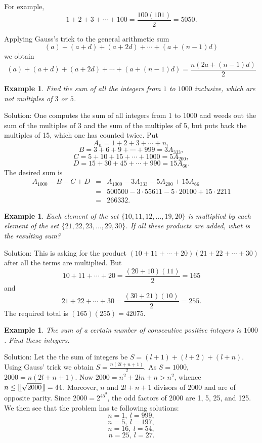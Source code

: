\documentclass[11pt, openany]{book}
\theoremstyle{change} \theoremheaderfont{\blue\sffamily\bfseries}
\newtheorem{exa}[thm]{Example}
\theoremstyle{nonumberplain} \theoremheaderfont{\sffamily\bfseries}
\newcommand{\dis}{\displaystyle}
\newcommand{\í}{\'{\i}}
\begin{document}
For example,
$$1 + 2 + 3 + \cdots + 100 = \frac{100(101)}{2} = 5050.$$


Applying Gauss's trick to the general arithmetic sum
$$ (a) + (a + d) + (a + 2d) + \cdots + (a + (n - 1)d) $$we obtain
\begin{equation}
(a) + (a + d) + (a + 2d) + \cdots + (a + (n - 1)d) = \frac{n(2a +
(n - 1)d)}{2}
\end{equation}


\begin{exa} Find the sum of all the integers from $1$ to $1000$ inclusive, which are not
multiples of $3$ or $5$.
\end{exa}
Solution: One computes the sum of all integers from 1 to 1000 and
weeds out the sum of the multiples of 3 and the sum of the
multiples of 5, but puts back the multiples of 15, which one has
counted twice. Put
$$A_n = 1 + 2 + 3 + \cdots + n,$$
$$B = 3 + 6 + 9 + \cdots + 999 = 3A_{333},$$
$$C = 5 + 10 + 15 + \cdots + 1000 = 5A_{200},$$
$$D= 15 + 30 + 45 +
\cdots + 990 = 15A_{66}.$$ The desired sum is
$$
\begin{array}{lll}
A_{1000} - B - C + D
 & = & A_{1000} - 3A_{333} - 5A_{200} + 15A_{66} \\
& = & 500500 - 3\cdot 55611  - 5\cdot 20100 + 15\cdot 2211 \\
&  = &  266332. \end{array}$$
\begin{exa}

Each element of the set $\{10, 11, 12, \ldots , 19, 20\}$ is
multiplied by each element of the set $\{21, 22, 23, \ldots , 29,
30\}$. If all these products are added, what is the resulting sum?
\end{exa}
Solution: This is asking for the product $(10 + 11 + \cdots +
20)(21 + 22 + \cdots + 30)$ after all the terms are multiplied.
But
$$10 + 11 + \cdots + 20 = \frac{(20 + 10)(11)}{2} = 165$$ and
$$21 + 22 + \cdots +
30 = \frac{(30 + 21)(10)}{2} = 255.$$ The required  total is
$(165)(255) = 42075$.
\begin{exa}
The sum of a certain number of consecutive positive integers is
$1000$. Find these integers.\end{exa} Solution: Let the the sum of
integers  be $S = (l + 1) +  (l + 2) + (l + n)$. Using Gauss' trick
we obtain $S = \dis{\frac{n(2l + n + 1)}{2}}$. As $S = 1000,$ $2000
= n(2l + n + 1)$. Now $2000 = n^2 + 2ln + n > n^2$, whence $n \leq
\llfloor\sqrt{2000}\rrfloor = 44$. Moreover, $n$ and $2l + n + 1$
divisors of 2000 and are of opposite parity. Since $2000 = 2^45^3$,
the odd factors of 2000 are 1, 5, 25, and 125. We then see that the
problem has te following solutions:
$$n = 1, \ l = 999,$$
$$n = 5, \ l = 197,$$
$$n = 16, \ l = 54,$$
$$n = 25, \ l = 27.$$
\end{document}
